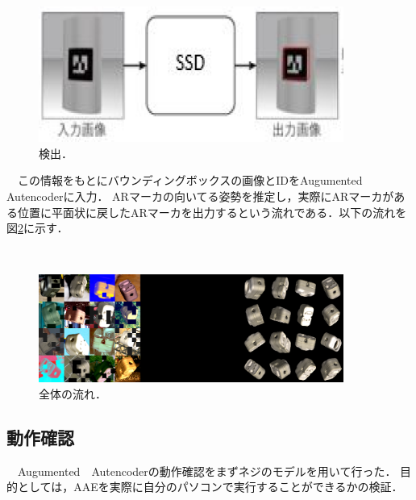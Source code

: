 \documentclass[11pt,a4j,ascmac]{jsarticle}
\begin{document}
      \begin{figure}[htpp]
      \centering
      \includegraphics[width=100mm]{1.eps}
      \vspace*{40mm}
      \caption{検出．}
      \label{style1}
      \end{figure}

　この情報をもとにバウンディングボックスの画像とIDをAugumented　Autencoderに入力．
ARマーカの向いてる姿勢を推定し，実際にARマーカがある位置に平面状に戻したARマーカを出力するという流れである．以下の流れを図\ref{style2}に示す．

　


      \begin{figure}[htpp]
      \centering
      \includegraphics[width=100mm]{pic2.eps}
      \vspace*{25mm}
      \caption{全体の流れ．}
      \label{style2}
      \end{figure}




\subsection{動作確認}
　Augumented　Autencoderの動作確認をまずネジのモデルを用いて行った．
目的としては，AAEを実際に自分のパソコンで実行することができるかの検証．

\end{document}
